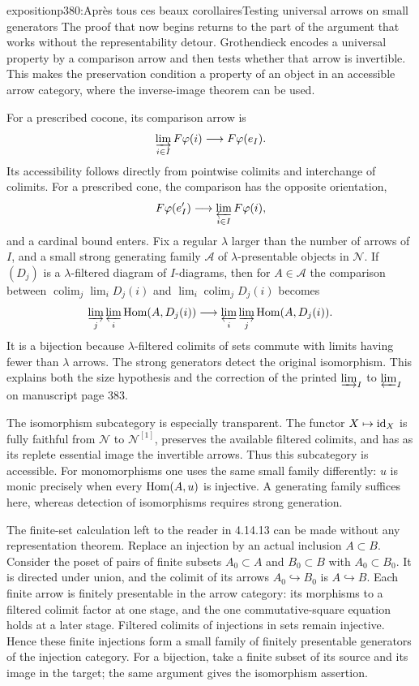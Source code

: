 \begin{dcomment}{exposition}{p380:Après tous ces beaux corollaires}{Testing universal arrows on small generators}
The proof that now begins returns to the part of the argument that works without the representability detour. Grothendieck encodes a universal property by a comparison arrow and then tests whether that arrow is invertible. This makes the preservation condition a property of an object in an accessible arrow category, where the inverse-image theorem can be used.

For a prescribed cocone, its comparison arrow is
\[
 \varinjlim_{i\in I}F\varphi(i)\longrightarrow F\varphi(e_I).
\]
Its accessibility follows directly from pointwise colimits and interchange of colimits. For a prescribed cone, the comparison has the opposite orientation,
\[
 F\varphi(e'_I)\longrightarrow\varprojlim_{i\in I}F\varphi(i),
\]
and a cardinal bound enters. Fix a regular $\lambda$ larger than the number of arrows of $I$, and a small strong generating family $\mathcal A$ of $\lambda$-presentable objects in $\mathcal N$. If $(D_j)$ is a $\lambda$-filtered diagram of $I$-diagrams, then for $A\in\mathcal A$ the comparison between $\operatorname{colim}_j\lim_iD_j(i)$ and $\lim_i\operatorname{colim}_jD_j(i)$ becomes
\[
 \varinjlim_j\varprojlim_i\operatorname{Hom}(A,D_j(i))
 \longrightarrow
 \varprojlim_i\varinjlim_j\operatorname{Hom}(A,D_j(i)).
\]
It is a bijection because $\lambda$-filtered colimits of sets commute with limits having fewer than $\lambda$ arrows. The strong generators detect the original isomorphism. This explains both the size hypothesis and the correction of the printed $\varinjlim_I$ to $\varprojlim_I$ on manuscript page 383.

The isomorphism subcategory is especially transparent. The functor $X\mapsto\mathrm{id}_X$ is fully faithful from $\mathcal N$ to $\mathcal N^{[1]}$, preserves the available filtered colimits, and has as its replete essential image the invertible arrows. Thus this subcategory is accessible. For monomorphisms one uses the same small family differently: $u$ is monic precisely when every $\operatorname{Hom}(A,u)$ is injective. A generating family suffices here, whereas detection of isomorphisms requires strong generation.

The finite-set calculation left to the reader in 4.14.13 can be made without any representation theorem. Replace an injection by an actual inclusion $A\subset B$. Consider the poset of pairs of finite subsets $A_0\subset A$ and $B_0\subset B$ with $A_0\subset B_0$. It is directed under union, and the colimit of its arrows $A_0\hookrightarrow B_0$ is $A\hookrightarrow B$. Each finite arrow is finitely presentable in the arrow category: its morphisms to a filtered colimit factor at one stage, and the one commutative-square equation holds at a later stage. Filtered colimits of injections in sets remain injective. Hence these finite injections form a small family of finitely presentable generators of the injection category. For a bijection, take a finite subset of its source and its image in the target; the same argument gives the isomorphism assertion.


\end{dcomment}
